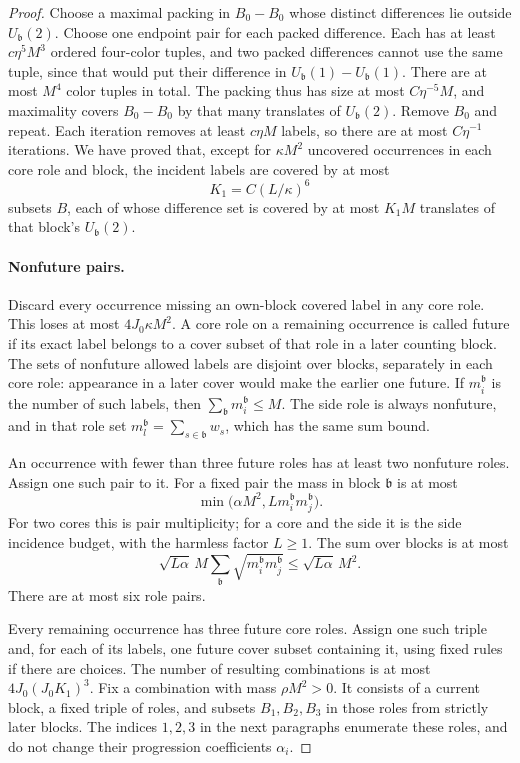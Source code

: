 \begin{proof}
Choose a maximal packing in $B_0-B_0$ whose distinct differences lie
outside $U_{\mathfrak b}(2)$.  Choose one endpoint pair for each
packed difference.  Each has at least $c\eta^5M^3$ ordered
four-color tuples, and two packed differences cannot use the same
tuple, since that would put their difference in
$U_{\mathfrak b}(1)-U_{\mathfrak b}(1)$.  There are at most $M^4$
color tuples in total.  The packing thus has size at most
$C\eta^{-5}M$, and maximality covers $B_0-B_0$ by that many
translates of $U_{\mathfrak b}(2)$.  Remove $B_0$ and repeat.
Each iteration removes at least $c\eta M$ labels, so there are at
most $C\eta^{-1}$ iterations.  We have proved that, except for
$\kappa M^2$ uncovered occurrences in each core role and block,
the incident labels are covered by at most
\[
 K_1=C(L/\kappa)^6
\]
subsets $B$, each of whose difference set is covered by at most
$K_1M$ translates of that block's $U_{\mathfrak b}(2)$.

\paragraph{Nonfuture pairs.}
Discard every occurrence missing an own-block covered label in any
core role.  This loses at most $4J_0\kappa M^2$.  A core role on a
remaining occurrence is called future if its exact label belongs to
a cover subset of that role in a later counting block.  The sets of
nonfuture allowed labels are disjoint over blocks, separately in
each core role: appearance in a later cover would make the earlier
one future.  If $m_i^{\mathfrak b}$ is the number of such labels,
then $\sum_{\mathfrak b}m_i^{\mathfrak b}\leq M$.  The side role is
always nonfuture, and in that role set
$m_l^{\mathfrak b}=\sum_{s\in\mathfrak b}w_s$, which has the same
sum bound.

An occurrence with fewer than three future roles has at least two
nonfuture roles.  Assign one such pair to it.  For a fixed pair the
mass in block $\mathfrak b$ is at most
\[
 \min\big(\alpha M^2,
            Lm_i^{\mathfrak b}m_j^{\mathfrak b}\big).
\]
For two cores this is pair multiplicity; for a core and the side it
is the side incidence budget, with the harmless factor $L\geq1$.
The sum over blocks is at most
\[
 \sqrt{L\alpha}\,M
 \sum_{\mathfrak b}
       \sqrt{m_i^{\mathfrak b}m_j^{\mathfrak b}}
 \leq\sqrt{L\alpha}\,M^2.
\]
There are at most six role pairs.

Every remaining occurrence has three future core roles.  Assign
one such triple and, for each of its labels, one future cover subset
containing it, using fixed rules if there are choices.  The number
of resulting combinations is at most
$4J_0(J_0K_1)^3$.  Fix a combination with mass $\rho M^2>0$.
It consists of a current block, a fixed triple of roles, and subsets
$B_1,B_2,B_3$ in those roles from strictly later blocks.  The indices
$1,2,3$ in the next paragraphs enumerate these roles, and do not
change their progression coefficients $\alpha_i$.


\end{proof}
